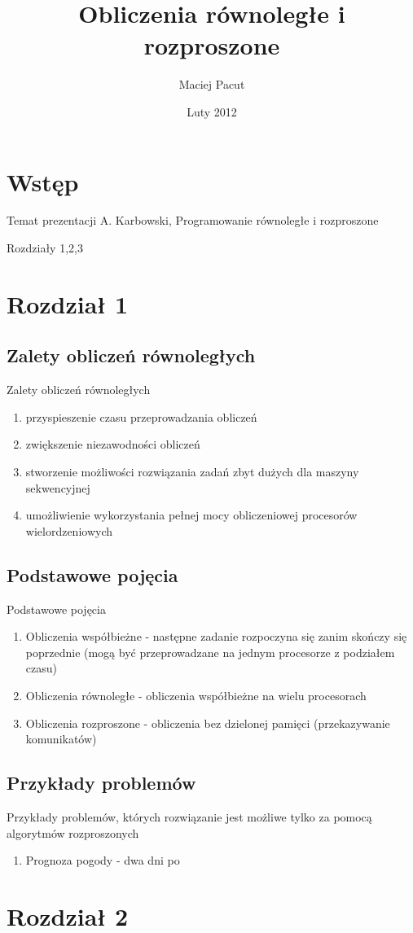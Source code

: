 \documentclass{beamer}
\title{Obliczenia równoległe i rozproszone}
\author{Maciej Pacut}
\date{Luty 2012}
\begin{document}
\begin{frame}
  \titlepage
\end{frame}

\begin{frame}
\tableofcontents
\end{frame}

\section{Wstęp}
\begin{frame}{Temat prezentacji}
  A. Karbowski, Programowanie równoległe i rozproszone

  Rozdziały 1,2,3
\end{frame}

\section{Rozdział 1}
\subsection{Zalety obliczeń równoległych}
\begin{frame}{Zalety obliczeń równoległych}
  \begin{enumerate}[<+->]
    \item przyspieszenie czasu przeprowadzania obliczeń
    \item zwiększenie niezawodności obliczeń
    \item stworzenie możliwości rozwiązania zadań zbyt dużych dla maszyny sekwencyjnej
    \item umożliwienie wykorzystania pełnej mocy obliczeniowej procesorów wielordzeniowych
  \end{enumerate}
\end{frame}

\subsection{Podstawowe pojęcia}
\begin{frame}{Podstawowe pojęcia}
  \begin{enumerate}
    \item Obliczenia współbieżne - następne zadanie rozpoczyna się zanim skończy się poprzednie (mogą być przeprowadzane na jednym procesorze z podziałem czasu)
    \item Obliczenia równoległe - obliczenia współbieżne na wielu procesorach
    \item Obliczenia rozproszone - obliczenia bez dzielonej pamięci (przekazywanie komunikatów)
  \end{enumerate}
\end{frame}

\subsection{Przykłady problemów}
\begin{frame}{Przykłady problemów, których rozwiązanie jest możliwe tylko za pomocą algorytmów rozproszonych}
  \begin{enumerate}
    \item Prognoza pogody - dwa dni po
  \end{enumerate}
\end{frame}

\section{Rozdział 2}
\end{document}
